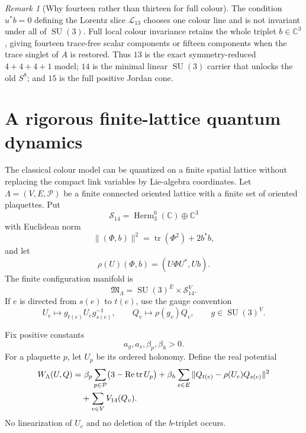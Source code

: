 \documentclass[11pt]{article}
\theoremstyle{definition}
\theoremstyle{remark}
\newtheorem{remark}[theorem]{Remark}
\newcommand{\C}{\mathbb C}
\newcommand{\Herm}{\operatorname{Herm}}
\newcommand{\tr}{\operatorname{tr}}
\newcommand{\Ree}{\operatorname{Re}}
\newcommand{\SU}{\operatorname{SU}}
\newcommand{\cL}{\mathcal L}
\begin{document}
\begin{remark}[Why fourteen rather than thirteen for full colour]
The condition $u^*b=0$ defining the Lorentz slice $\cL_{13}$ chooses one colour line and is not invariant under all of $\SU(3)$.  Full local colour invariance retains the whole triplet $b\in\C^3$, giving fourteen trace-free scalar components or fifteen components when the trace singlet of $A$ is restored.  Thus $13$ is the exact symmetry-reduced $4+4+4+1$ model; $14$ is the minimal linear $\SU(3)$ carrier that unlocks the old $S^8$; and $15$ is the full positive Jordan cone.
\end{remark}


\section{A rigorous finite-lattice quantum dynamics}

The classical colour model can be quantized on a finite spatial lattice without
replacing the compact link variables by Lie-algebra coordinates.  Let
$\Lambda=(V,E,\mathcal P)$ be a finite connected oriented lattice with a finite
set of oriented plaquettes.  Put
\[
 \mathcal S_{14}=\Herm_3^0(\C)\oplus\C^3
\]
with Euclidean norm
\[
 \|(\Phi,b)\|^2=\tr(\Phi^2)+2b^*b,
\]
and let
\[
 \rho(U)(\Phi,b)=(U\Phi U^*,Ub).
\]
The finite configuration manifold is
\begin{equation}\label{eq:lattice-config}
 \mathfrak M_\Lambda=\SU(3)^E\times\mathcal S_{14}^{V}.
\end{equation}
If $e$ is directed from $s(e)$ to $t(e)$, use the gauge convention
\begin{equation}\label{eq:lattice-gauge}
 U_e\longmapsto g_{t(e)}U_eg_{s(e)}^{-1},
 \qquad Q_v\longmapsto\rho(g_v)Q_v,
 \qquad g\in\SU(3)^V.
\end{equation}

Fix positive constants
\[
 a_g,a_s,\beta_p,\beta_h>0.
\]
For a plaquette $p$, let $U_p$ be its ordered holonomy.  Define the real
potential
\begin{align}\label{eq:lattice-potential}
 W_\Lambda(U,Q)
 =&\ \beta_p\sum_{p\in\mathcal P}
       \bigl(3-\Ree\tr U_p\bigr)
 +\beta_h\sum_{e\in E}
       \|Q_{t(e)}-\rho(U_e)Q_{s(e)}\|^2\notag\\
 &+\sum_{v\in V}V_{14}(Q_v).
\end{align}
No linearization of $U_e$ and no deletion of the $b$-triplet occurs.
\end{document}
